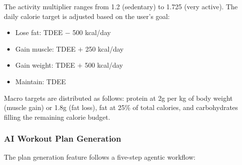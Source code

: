 The activity multiplier ranges from 1.2 (sedentary) to 1.725 (very active).
The daily calorie target is adjusted based on the user's goal:
\begin{itemize}
    \item Lose fat: TDEE $-$ 500 kcal/day
    \item Gain muscle: TDEE $+$ 250 kcal/day
    \item Gain weight: TDEE $+$ 500 kcal/day
    \item Maintain: TDEE
\end{itemize}

Macro targets are distributed as follows: protein at 2g per kg of body
weight (muscle gain) or 1.8g (fat loss), fat at 25\% of total calories, and
carbohydrates filling the remaining calorie budget.

\subsubsection{AI Workout Plan Generation}

The plan generation feature follows a five-step agentic workflow:

